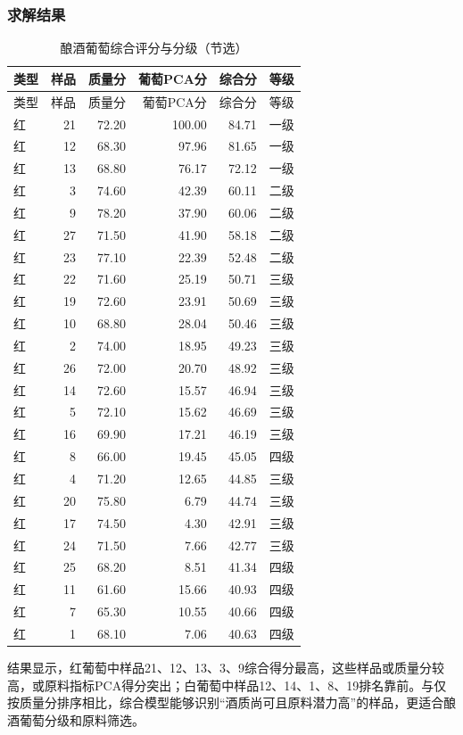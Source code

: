 \documentclass[UTF8,a4paper,12pt]{ctexart}
\begin{document}
\subsubsection{求解结果}
\begin{longtable}{lrrrrl}\caption{酿酒葡萄综合评分与分级（节选）}\\\toprule 类型 & 样品 & 质量分 & 葡萄PCA分 & 综合分 & 等级\\\midrule\endfirsthead\toprule 类型 & 样品 & 质量分 & 葡萄PCA分 & 综合分 & 等级\\\midrule\endhead
红 & 21 & 72.20 & 100.00 & 84.71 & 一级 \\
红 & 12 & 68.30 & 97.96 & 81.65 & 一级 \\
红 & 13 & 68.80 & 76.17 & 72.12 & 一级 \\
红 & 3 & 74.60 & 42.39 & 60.11 & 二级 \\
红 & 9 & 78.20 & 37.90 & 60.06 & 二级 \\
红 & 27 & 71.50 & 41.90 & 58.18 & 二级 \\
红 & 23 & 77.10 & 22.39 & 52.48 & 二级 \\
红 & 22 & 71.60 & 25.19 & 50.71 & 三级 \\
红 & 19 & 72.60 & 23.91 & 50.69 & 三级 \\
红 & 10 & 68.80 & 28.04 & 50.46 & 三级 \\
红 & 2 & 74.00 & 18.95 & 49.23 & 三级 \\
红 & 26 & 72.00 & 20.70 & 48.92 & 三级 \\
红 & 14 & 72.60 & 15.57 & 46.94 & 三级 \\
红 & 5 & 72.10 & 15.62 & 46.69 & 三级 \\
红 & 16 & 69.90 & 17.21 & 46.19 & 三级 \\
红 & 8 & 66.00 & 19.45 & 45.05 & 四级 \\
红 & 4 & 71.20 & 12.65 & 44.85 & 三级 \\
红 & 20 & 75.80 & 6.79 & 44.74 & 三级 \\
红 & 17 & 74.50 & 4.30 & 42.91 & 三级 \\
红 & 24 & 71.50 & 7.66 & 42.77 & 三级 \\
红 & 25 & 68.20 & 8.51 & 41.34 & 四级 \\
红 & 11 & 61.60 & 15.66 & 40.93 & 四级 \\
红 & 7 & 65.30 & 10.55 & 40.66 & 四级 \\
红 & 1 & 68.10 & 7.06 & 40.63 & 四级 \\
\bottomrule\end{longtable}
结果显示，红葡萄中样品21、12、13、3、9综合得分最高，这些样品或质量分较高，或原料指标PCA得分突出；白葡萄中样品12、14、1、8、19排名靠前。与仅按质量分排序相比，综合模型能够识别“酒质尚可且原料潜力高”的样品，更适合酿酒葡萄分级和原料筛选。
\end{document}
